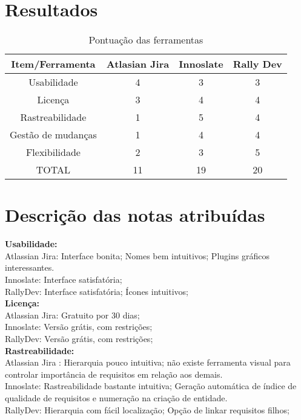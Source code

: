 \section {\large{Resultados}}

\begin{table}[h]
\centering
\vspace{0.5cm}
\begin{tabular}{ c | c | c | c } \hline
Item/Ferramenta & Atlasian Jira  & Innoslate & Rally Dev \\ \hline
Usabilidade & 4 & 3 & 3 \\ \hline
Licença & 3 & 4 & 4 \\ \hline
Rastreabilidade & 1 & 5 & 4 \\ \hline
Gestão de mudanças & 1 & 4 & 4 \\ \hline
Flexibilidade & 2 & 3 & 5  \\ \hline
TOTAL & 11 & 19 & 20 \\ \hline
\end{tabular}
\caption{Pontuação das ferramentas}
\end{table}

\section {\large{Descrição das notas atribuídas}}

\textbf{Usabilidade:}\\
\tab Atlassian Jira: Interface bonita; Nomes bem intuitivos; Plugins gráficos interessantes.\\
\tab Innoslate: Interface satisfatória; \\
\tab RallyDev: Interface satisfatória; Ícones intuitivos;\\

\textbf{Licença:}\\
\tab Atlassian Jira: Gratuito por 30 dias;\\
\tab Innoslate: Versão grátis, com restrições;\\
\tab RallyDev: Versão grátis, com restrições;\\

\textbf{Rastreabilidade:}\\
\tab Atlassian Jira : Hierarquia pouco intuitiva; não existe ferramenta visual para controlar importância de requisitos em relação aos demais.\\
\tab Innoslate: Rastreabilidade bastante intuitiva; Geração automática de índice de qualidade de requisitos e numeração na criação de entidade.\\
\tab RallyDev: Hierarquia com fácil localização; Opção de linkar requisitos filhos;\\


